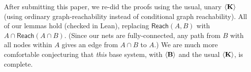 \documentclass[letterpaper]{article}
\theoremstyle{definition}
\newcommand{\Reach}{\textsf{Reach}}
\newcommand{\KnowNoArgs}{\textrm{\textup{\textbf{K}}}}
\newcommand{\diaBelieveNoArgs}{\langle \textrm{\textup{\textbf{B}}} \rangle}
\newcommand{\diaKnowNoArgs}{\langle \textrm{\textup{\textbf{K}}} \rangle}
\begin{document}
After submitting this paper, we re-did the proofs using the usual, unary $\diaKnowNoArgs$ (using ordinary graph-reachability instead of conditional graph reachability).  All of our lemmas hold (checked in Lean), replacing $\Reach(A, B)$ with $A \cap \Reach(A \cap B)$.  (Since our nets are fully-connected, any path from $B$ with all nodes within $A$ gives an edge from $A \cap B$ to $A$.)  We are much more comfortable conjecturing that \textit{this} base system, with $\diaBelieveNoArgs$ and the usual $\diaKnowNoArgs$, is complete.




% 
\end{document}
